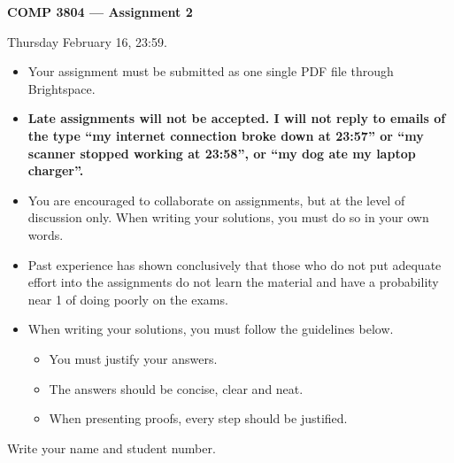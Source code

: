 \documentclass[12pt]{article}
\newcounter{ques}
\newenvironment{question}{\stepcounter{ques}{\noindent\bf Question \arabic{ques}:}}{\vspace{5mm}}
\begin{document}
 

\begin{center} \Large\bf
COMP 3804 --- Assignment 2 
\end{center} 

 Thursday February 16, 23:59.

\vspace{0.5em}

\begin{itemize}
\item Your assignment must be submitted as one single PDF file through
      Brightspace.

\begin{center}
\hfill{}
\end{center}
\item {\bf Late assignments will not be accepted. I will not reply to
      emails of the type ``my internet connection broke down at
      23:57'' or ``my scanner stopped working at 23:58'', or
      ``my dog ate my laptop charger''.}
\item You are encouraged to collaborate on assignments, but at the level
      of discussion only. When writing your solutions, you must do so
      in your own words.
\item Past experience has shown conclusively that those who do not put
      adequate effort into the assignments do not learn the material and
      have a probability near 1 of doing poorly on the exams.
\item When writing your solutions, you must follow the guidelines below.
      \begin{itemize}
      \item You must justify your answers.
      \item The answers should be concise, clear and neat.
      \item When presenting proofs, every step should be justified.
      \end{itemize}
\end{itemize}

\newpage 

\begin{question}
Write your name and student number.
\end{question}
\end{document}
